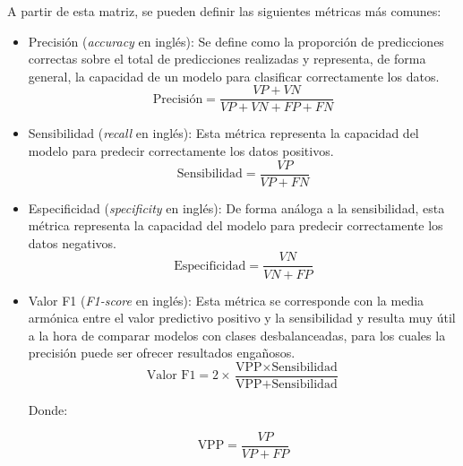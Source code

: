 A partir de esta matriz, se pueden definir las siguientes métricas más comunes:

\begin{itemize}
	\item Precisión (\textit{accuracy} en inglés): Se define como la proporción de predicciones correctas sobre el total de predicciones realizadas
	      y representa, de forma general, la capacidad de un modelo para clasificar correctamente los datos.
	      \begin{equation}
		      \label{eq:accuracy}
		      \text{Precisión} = \frac{VP + VN}{VP + VN + FP + FN}
	      \end{equation}

	\item Sensibilidad (\textit{recall} en inglés): Esta métrica representa la capacidad del modelo para predecir correctamente los datos positivos.
	      \begin{equation}
		      \label{eq:recall}
		      \text{Sensibilidad} = \frac{VP}{VP + FN}
	      \end{equation}

	\item Especificidad (\textit{specificity} en inglés): De forma análoga a la sensibilidad, esta métrica representa la capacidad del
	      modelo para predecir correctamente los datos negativos.
	      \begin{equation}
		      \label{eq:specificity}
		      \text{Especificidad} = \frac{VN}{VN + FP}
	      \end{equation}

	\item Valor F1 (\textit{F1-score} en inglés): Esta métrica se corresponde con la media armónica entre el valor predictivo positivo y la sensibilidad
	      y resulta muy útil a la hora de comparar modelos con clases desbalanceadas, para los cuales la precisión puede ser ofrecer resultados engañosos.
	      \begin{equation}
		      \label{eq:f1}
		      \text{Valor F1} = 2 \times \frac{\text{VPP} \times \text{Sensibilidad}}{\text{VPP} + \text{Sensibilidad}}
	      \end{equation}

				Donde:

				\begin{equation}
					\label{eq:vpp}
					\text{VPP} = \frac{VP}{VP + FP}
				\end{equation}
\end{itemize}

